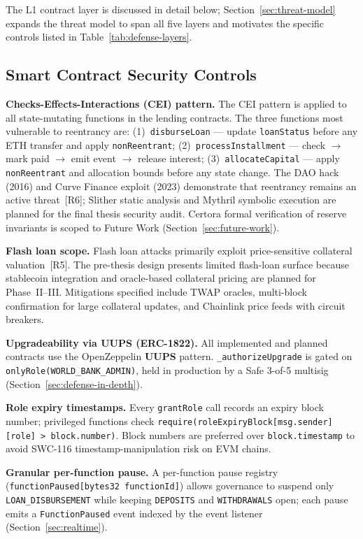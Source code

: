 \documentclass[12pt,a4paper]{report}
\begin{document}
The L1 contract layer is discussed in detail below; Section~\ref{sec:threat-model} expands the threat model to span all five layers and motivates the specific controls listed in Table~\ref{tab:defense-layers}.

\subsection{Smart Contract Security Controls}
\label{sec:contract-security}

\textbf{Checks-Effects-Interactions (CEI) pattern.} The CEI pattern is applied to all state-mutating functions in the lending contracts. The three functions most vulnerable to reentrancy are: (1)~\texttt{disburseLoan} --- update \texttt{loanStatus} before any ETH transfer and apply \texttt{nonReentrant}; (2)~\texttt{processInstallment} --- check $\to$ mark paid $\to$ emit event $\to$ release interest; (3)~\texttt{allocateCapital} --- apply \texttt{nonReentrant} and allocation bounds before any state change. The DAO hack (2016) and Curve Finance exploit (2023) demonstrate that reentrancy remains an active threat~[R6]; Slither static analysis and Mythril symbolic execution are planned for the final thesis security audit. Certora formal verification of reserve invariants is scoped to Future Work (Section~\ref{sec:future-work}).

\textbf{Flash loan scope.} Flash loan attacks primarily exploit price-sensitive collateral valuation~[R5]. The pre-thesis design presents limited flash-loan surface because stablecoin integration and oracle-based collateral pricing are planned for Phase~II--III. Mitigations specified include TWAP oracles, multi-block confirmation for large collateral updates, and Chainlink price feeds with circuit breakers.

\textbf{Upgradeability via UUPS (ERC-1822).} All implemented and planned contracts use the OpenZeppelin \textbf{UUPS} pattern. \texttt{\_authorizeUpgrade} is gated on \texttt{onlyRole(WORLD\_BANK\_ADMIN)}, held in production by a Safe 3-of-5 multisig (Section~\ref{sec:defense-in-depth}).

\textbf{Role expiry timestamps.} Every \texttt{grantRole} call records an expiry block number; privileged functions check \texttt{require(roleExpiryBlock[msg.sender][role] > block.number)}. Block numbers are preferred over \texttt{block.timestamp} to avoid SWC-116 timestamp-manipulation risk on EVM chains.

\textbf{Granular per-function pause.} A per-function pause registry (\texttt{functionPaused[bytes32 functionId]}) allows governance to suspend only \texttt{LOAN\_DISBURSEMENT} while keeping \texttt{DEPOSITS} and \texttt{WITHDRAWALS} open; each pause emits a \texttt{FunctionPaused} event indexed by the event listener (Section~\ref{sec:realtime}).
\end{document}
